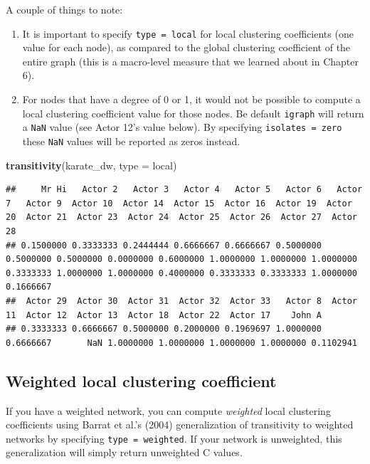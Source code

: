 \documentclass[
]{book}
\newenvironment{Shaded}{\begin{snugshade}}{\end{snugshade}}
\newcommand{\AttributeTok}[1]{\textcolor[rgb]{0.13,0.29,0.53}{#1}}
\newcommand{\FunctionTok}[1]{\textcolor[rgb]{0.13,0.29,0.53}{\textbf{#1}}}
\newcommand{\NormalTok}[1]{#1}
\newcommand{\StringTok}[1]{\textcolor[rgb]{0.31,0.60,0.02}{#1}}
\begin{document}
A couple of things to note:

\begin{enumerate}
\def\labelenumi{\arabic{enumi}.}
\item
  It is important to specify \texttt{type\ =\ local} for local clustering coefficients (one value for each node), as compared to the global clustering coefficient of the entire graph (this is a macro-level measure that we learned about in Chapter 6).
\item
  For nodes that have a degree of 0 or 1, it would not be possible to compute a local clustering coefficient value for those nodes. Be default \texttt{igraph} will return a \texttt{NaN} value (see Actor 12's value below). By specifying \texttt{isolates\ =\ \textquotesingle{}zero\textquotesingle{}} these \texttt{NaN} values will be reported as zeros instead.
\end{enumerate}

\begin{Shaded}
\begin{Highlighting}[]
\FunctionTok{transitivity}\NormalTok{(karate\_dw, }\AttributeTok{type =} \StringTok{\textquotesingle{}local\textquotesingle{}}\NormalTok{)}
\end{Highlighting}
\end{Shaded}

\begin{verbatim}
##     Mr Hi   Actor 2   Actor 3   Actor 4   Actor 5   Actor 6   Actor 7   Actor 9  Actor 10  Actor 14  Actor 15  Actor 16  Actor 19  Actor 20  Actor 21  Actor 23  Actor 24  Actor 25  Actor 26  Actor 27  Actor 28 
## 0.1500000 0.3333333 0.2444444 0.6666667 0.6666667 0.5000000 0.5000000 0.5000000 0.0000000 0.6000000 1.0000000 1.0000000 1.0000000 0.3333333 1.0000000 1.0000000 0.4000000 0.3333333 0.3333333 1.0000000 0.1666667 
##  Actor 29  Actor 30  Actor 31  Actor 32  Actor 33   Actor 8  Actor 11  Actor 12  Actor 13  Actor 18  Actor 22  Actor 17    John A 
## 0.3333333 0.6666667 0.5000000 0.2000000 0.1969697 1.0000000 0.6666667       NaN 1.0000000 1.0000000 1.0000000 1.0000000 0.1102941
\end{verbatim}

\subsection{Weighted local clustering coefficient}\label{weighted-local-clustering-coefficient}

If you have a weighted network, you can compute \emph{weighted} local clustering coefficients using Barrat et al.'s (2004) generalization of transitivity to weighted networks by specifying \texttt{type\ =\ \textquotesingle{}weighted\textquotesingle{}}. If your network is unweighted, this generalization will simply return unweighted C values.
\end{document}
